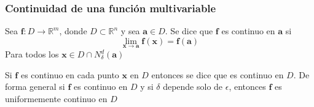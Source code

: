 \subsubsection{Continuidad de una función multivariable}
\begin{definition}
	Sea $\mathbf{f}: D \rightarrow \mathbb{R}^m$, donde $D \subset \mathbb{R}^n$ y sea $\mathbf{a} \in D$. Se dice que $\mathbf{f}$ es continuo en $\mathbf{a}$ si
	$$\lim_{\mathbf{x} \to \mathbf{a}} \mathbf{f(x) = f(a)}$$
	Para todos los $\mathbf{x} \in D \cap {N}_{\delta}^{d}(\mathbf{a})$
\end{definition}
Si $\mathbf{f}$ es continuo en cada punto $\mathbf{x}$ en $D$ entonces se dice que es continuo en $D$. De forma general si $\mathbf{f}$ es continuo en $D$ y si $\delta$ depende solo de $\epsilon$, entonces $\mathbf{f}$ es uniformemente continuo en $D$

